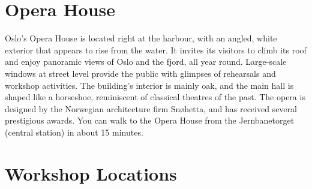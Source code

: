 \documentclass{article}
\begin{document}
\vspace{1cm}

\section*{Opera House}
Oslo's Opera House is located right at the harbour, with an angled, white exterior that
appears to rise from the water. It invites its visitors to climb its roof and enjoy
panoramic views of Oslo and the fjord, all year round. Large-scale windows at street
level provide the public with glimpses of rehearsals and workshop activities. The
building's interior is mainly oak, and the main hall is shaped like a horseshoe,
reminiscent of classical theatres of the past. The opera is designed by the Norwegian
architecture firm Snøhetta, and has received several prestigious awards. You can walk to
the Opera House from the Jernbanetorget (central station) in about 15 minutes.

\clearpage


\bigskip
\bigskip

\section*{Workshop Locations}
\end{document}
